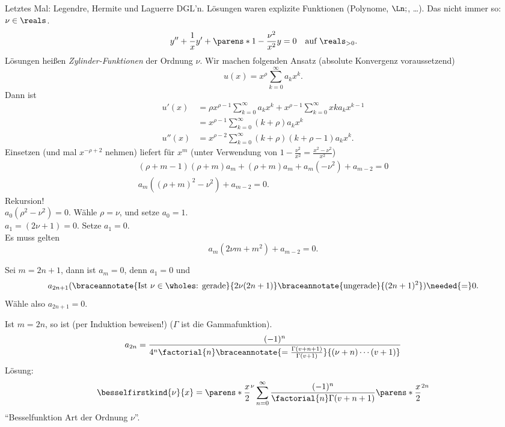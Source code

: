 Letztes Mal: Legendre, Hermite und Laguerre DGL'n. Lösungen waren explizite Funktionen (Polynome, \( \Ln; \), \dots). Das nicht immer so:
 \( \nu\in \reals \).
\begin{equation*}
  y''+\frac{1}{x}y'+\parens*{1-\frac{\nu^2}{x^2}}y=0\quad \text{auf }\reals_{>0}.
\end{equation*}
Lösungen heißen \emph{Zylinder-Funktionen} der Ordnung \( \nu \). Wir machen folgenden Ansatz (absolute Konvergenz voraussetzend)
\begin{equation*}
  u(x)=x^{\rho}\sum_{k=0}^{\infty}a_k x^k.
\end{equation*}
Dann ist
\begin{align*}
  u'(x)&=\rho x^{\rho-1}\sum_{k=0}^{\infty}a_k x^k+x^{\rho-1}\sum_{k=0}^{\infty}x k a_k x^{k-1}\\
  &=x^{\rho-1}\sum_{k=0}^{\infty}(k+\rho)a_k x^k\\
  u''(x)&=x^{\rho-2}\sum_{k=0}^{\infty}(k+\rho)(k+\rho-1)a_k x^k.
\end{align*}
Einsetzen (und mal \( x^{-\rho+2} \) nehmen) liefert für \( x^m \) (unter Verwendung von \( 1-\frac{\nu^2}{x^2}=\frac{x^2-\nu^2}{x^2} \))
\begin{gather*}
  (\rho+m-1)(\rho+m)a_m+(\rho+m)a_m+a_m(-\nu^2)+a_{m-2}=0\\
  a_m((\rho+m)^2-\nu^2)+a_{m-2}=0.
\end{gather*}
Rekursion! \\
\( a_0(\rho^2-\nu^2)=0 \). Wähle \( \rho=\nu \), und setze \( a_0=1 \). \\
\( a_1=(2\nu+1)=0 \). Setze \( a_1=0 \).\\
Es muss gelten
\begin{equation*}
  a_m(2\nu m+m^2)+a_{m-2}=0.
\end{equation*}

Sei \( m=2n+1 \), dann ist \( a_m=0 \), denn \( a_1=0 \) und
\begin{equation*}
  a_{2n+1}(\braceannotate{\text{Ist \( \nu\in\wholes \): gerade}}{2\nu(2n+1)}\braceannotate{\text{ungerade}}{(2n+1)^2})\needed{=}0.
\end{equation*}
Wähle also \( a_{2n+1}=0 \).

Ist \( m=2n \), so ist (per Induktion beweisen!) (\( \Gamma \) ist die Gammafunktion).
\begin{equation*}
  a_{2n}=\frac{(-1)^n}{4^n\factorial{n}\braceannotate{=\frac{\Gamma(v+n+1)}{\Gamma(v+1)}}{(\nu+n)\dotsm (v+1)}}
\end{equation*}
\timplies Lösung:
\begin{equation*}
  \besselfirstkind{\nu}{x}=\parens*{\frac{x}{2}}^{\nu}\sum_{n=0}^{\infty}\frac{(-1)^n}{\factorial{n}\Gamma(v+n+1)}\parens*{\frac{x}{2}}^{2n}
\end{equation*}
\enquote{Besselfunktion  Art der Ordnung \( \nu \)}.

